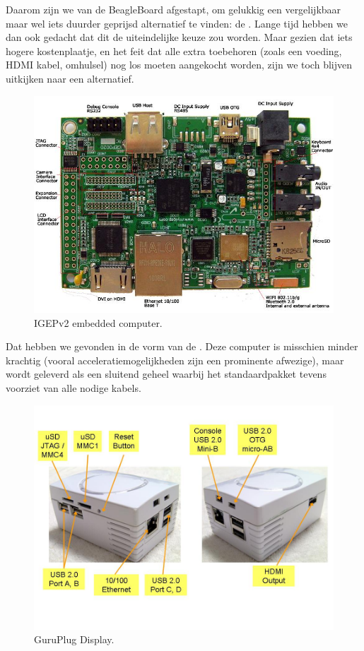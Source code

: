 Daarom zijn we van de BeagleBoard afgestapt, om gelukkig een vergelijkbaar maar wel iets duurder geprijsd alternatief te vinden: de . Lange tijd hebben we dan ook gedacht dat dit de uiteindelijke keuze zou worden. Maar gezien dat iets hogere kostenplaatje, en het feit dat alle extra toebehoren (zoals een voeding, HDMI kabel, omhulsel) nog los moeten aangekocht worden, zijn we toch blijven uitkijken naar een alternatief.

\begin{figure}
	\includegraphics[width=\textwidth]{afbeeldingen/IGEPv2}
	\caption{IGEPv2 embedded computer.}
\end{figure}

Dat hebben we gevonden in de vorm van de . Deze computer is misschien minder krachtig (vooral acceleratiemogelijkheden zijn een prominente afwezige), maar wordt geleverd als een sluitend geheel waarbij het standaardpakket tevens voorziet van alle nodige kabels.

\begin{figure}
	\includegraphics[width=\textwidth]{afbeeldingen/GuruPlug_Display}
	\caption{GuruPlug Display.}
\end{figure}

